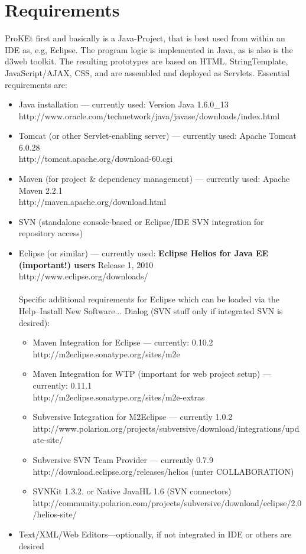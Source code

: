 \documentclass[a4paper,10pt]{scrreprt}
\begin{document}
\section{Requirements} \label{requirements}
ProKEt first and basically is a Java-Project, that is best used from within an IDE as, e.g, Eclipse. The program
logic is implemented in Java, as is also is the d3web toolkit. The resulting prototypes are 
based on HTML, StringTemplate, JavaScript/AJAX, CSS, and are assembled and deployed as Servlets. 
Essential requirements are:
\begin{itemize}
	\item Java installation --- currently used: Version Java 1.6.0\_13\\
	http://www.oracle.com/technetwork/java/javase/downloads/index.html
	\item Tomcat (or other Servlet-enabling server) --- currently used: Apache Tomcat 6.0.28\\
	http://tomcat.apache.org/download-60.cgi
	\item Maven (for project \& dependency management) --- currently used: Apache Maven 2.2.1\\
	http://maven.apache.org/download.html
	\item SVN (standalone console-based or Eclipse/IDE SVN integration for repository access)
	\item Eclipse (or similar) --- currently used: \textbf{Eclipse Helios for Java EE (important!) users} Release 1, 2010\\
	http://www.eclipse.org/downloads/\\ \\
	Specific additional requirements for Eclipse which can be loaded via the Help--Install New Software... Dialog (SVN stuff only if integrated SVN is desired):
	\begin{itemize}
		\item Maven Integration for Eclipse --- currently: 0.10.2\\
		http://m2eclipse.sonatype.org/sites/m2e
		\item Maven Integration for WTP (important for web project setup) --- currently: 0.11.1\\
		http://m2eclipse.sonatype.org/sites/m2e-extras
		\item Subversive Integration for M2Eclipse --- currently 1.0.2\\
		http://www.polarion.org/projects/subversive/download/integrations/update-site/
		\item Subversive SVN Team Provider --- currently 0.7.9\\
		http://download.eclipse.org/releases/helios (unter COLLABORATION)
		\item SVNKit 1.3.2. or Native JavaHL 1.6 (SVN connectors)\\
		http://community.polarion.com/projects/subversive/download/eclipse/2.0/helios-site/
	\end{itemize}
	\item Text/XML/Web Editors---optionally, if not integrated in IDE or others are desired 
\end{itemize}
\end{document}

